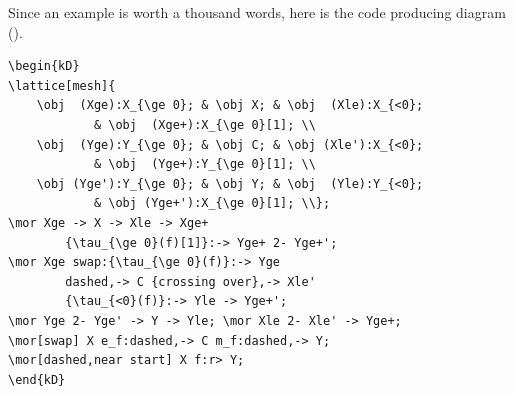 Since an example is worth a thousand words, here is the code producing diagram ().
\begin{center}
\end{center}
\begin{lstlisting}
\begin{kD}
\lattice[mesh]{
	\obj  (Xge):X_{\ge 0}; & \obj X; & \obj  (Xle):X_{<0}; 
			& \obj  (Xge+):X_{\ge 0}[1]; \\
	\obj  (Yge):Y_{\ge 0}; & \obj C; & \obj (Xle'):X_{<0}; 
			& \obj  (Yge+):Y_{\ge 0}[1]; \\
	\obj (Yge'):Y_{\ge 0}; & \obj Y; & \obj  (Yle):Y_{<0}; 
			& \obj (Yge+'):X_{\ge 0}[1]; \\};
\mor Xge -> X -> Xle -> Xge+ 
		{\tau_{\ge 0}(f)[1]}:-> Yge+ 2- Yge+';
\mor Xge swap:{\tau_{\ge 0}(f)}:-> Yge 
		dashed,-> C {crossing over},-> Xle' 
		{\tau_{<0}(f)}:-> Yle -> Yge+';
\mor Yge 2- Yge' -> Y -> Yle; \mor Xle 2- Xle' -> Yge+;
\mor[swap] X e_f:dashed,-> C m_f:dashed,-> Y;
\mor[dashed,near start] X f:r> Y;
\end{kD}
\end{lstlisting}
